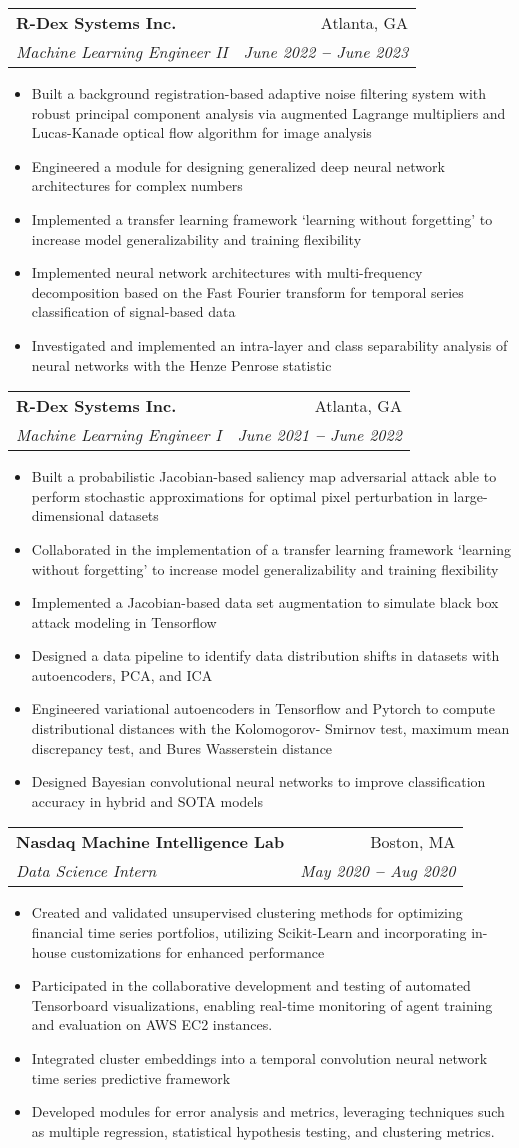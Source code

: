 \documentclass[letterpaper,11pt]{article}
\makeatletter
\newcommand{\resumeItem}[1]{
  \item\small{
    {#1 \vspace{-2pt}}
  }
}
\newcommand{\resumeSubheading}[4]{
  \vspace{-2pt}\item
    \begin{tabular*}{0.97\textwidth}[t]{l@{\extracolsep{\fill}}r}
      \textbf{#1} & #2 \\
      \textit{\small#3} & \textit{\small #4} \\
    \end{tabular*}\vspace{-7pt}
}
\newcommand{\resumeItemListStart}{\begin{itemize}}
\newcommand{\resumeItemListEnd}{\end{itemize}\vspace{-5pt}}
\makeatother
\begin{document}
    \resumeSubheading
      {R-Dex Systems Inc.}{Atlanta, GA}
      {Machine Learning Engineer II}{June 2022 \textbf{--} June 2023}
        \resumeItemListStart
            \resumeItem{Built a background registration-based adaptive noise filtering system with robust principal component analysis via augmented Lagrange multipliers and Lucas-Kanade optical flow algorithm for image analysis}
            \resumeItem{Engineered a module for designing generalized deep neural network architectures for complex numbers }
            \resumeItem{Implemented a transfer learning framework ‘learning without forgetting’ to increase model generalizability and training
flexibility}
            \resumeItem{Implemented neural network architectures with multi-frequency decomposition based on the Fast Fourier transform for temporal series classification of signal-based data}
            \resumeItem{Investigated and implemented an intra-layer and class separability analysis of neural networks with the Henze Penrose
statistic}

        \resumeItemListEnd

    \resumeSubheading
      {R-Dex Systems Inc.}{Atlanta, GA}
      {Machine Learning Engineer I}{June 2021 \textbf{--} June 2022}
        \resumeItemListStart
            \resumeItem{Built a probabilistic Jacobian-based saliency map adversarial attack able to perform stochastic approximations for optimal pixel perturbation in large-dimensional datasets}
            \resumeItem{Collaborated in the implementation of a transfer learning framework ‘learning without forgetting’ to increase model generalizability and training flexibility}
            \resumeItem{Implemented a Jacobian-based data set augmentation to simulate black box attack modeling in Tensorflow}
            \resumeItem{Designed a data pipeline to identify data distribution shifts in datasets with autoencoders, PCA, and ICA}
            \resumeItem{Engineered variational autoencoders in Tensorflow and Pytorch to compute distributional distances with the Kolomogorov-
Smirnov test, maximum mean discrepancy test, and Bures Wasserstein distance}
            \resumeItem{Designed Bayesian convolutional neural networks to improve classification accuracy in hybrid and SOTA models}
        \resumeItemListEnd
    

    \resumeSubheading
      {Nasdaq Machine Intelligence Lab}{Boston, MA}
      {Data Science Intern}{May 2020 \textbf{--} Aug 2020}
        \resumeItemListStart
            \resumeItem{Created and validated unsupervised clustering methods for optimizing financial time series portfolios, utilizing Scikit-Learn and incorporating in-house customizations for enhanced performance}
            \resumeItem{Participated in the collaborative development and testing of automated Tensorboard visualizations, enabling real-time monitoring of agent training and evaluation on AWS EC2 instances.}
            \resumeItem{Integrated cluster embeddings into a temporal convolution neural network time series predictive framework}
            \resumeItem{Developed modules for error analysis and metrics, leveraging techniques such as multiple regression, statistical hypothesis testing, and clustering metrics.}
        \resumeItemListEnd
\end{document}
